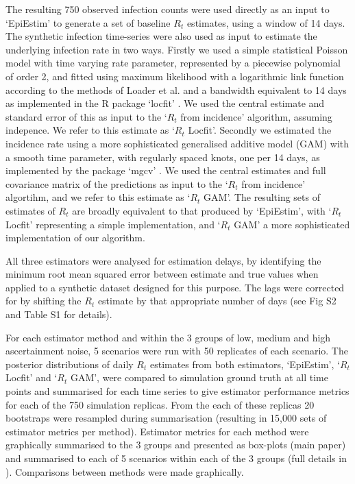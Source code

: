 \documentclass[10pt,letterpaper]{article}
\begin{document}
The resulting 750 observed infection counts were used directly as an input to `EpiEstim' to generate a set of baseline $R_t$ estimates, using a window of 14 days. The synthetic infection time-series were also used as input to estimate the underlying infection rate in two ways. Firstly we used a simple statistical Poisson model with time varying rate parameter, represented by a piecewise polynomial of order 2, and fitted using maximum likelihood with a logarithmic link function according to the methods of Loader et al. \cite{loader1999} and a bandwidth equivalent to 14 days as implemented in the R package `locfit' \cite{loader2020}. We used the central estimate and standard error of this as input to the `$R_t$ from incidence' algorithm, assuming indepence. We refer to this estimate as `$R_t$ Locfit'. Secondly we estimated the incidence rate using a more sophisticated generalised additive model (GAM) with a smooth time parameter, with regularly spaced knots, one per 14 days, as implemented by the package `mgcv' \cite{wood2017}. We used the central estimates and full covariance matrix of the predictions as input to the `$R_t$ from incidence' algortihm, and we refer to this estimate as `$R_t$ GAM'. The resulting sets of estimates of $R_t$ are broadly equivalent to that produced by `EpiEstim', with `$R_t$ Locfit' representing a simple implementation, and `$R_t$ GAM' a more sophisticated implementation of our algorithm.

All three estimators were analysed for estimation delays, by identifying the minimum root mean squared error between estimate and true values when applied to a synthetic dataset designed for this purpose. The lags were corrected for by shifting the $R_t$ estimate by that appropriate number of days (see  Fig S2 and Table S1 for details).

For each estimator method and within the 3 groups of low, medium and high ascertainment noise, 5 scenarios were run with 50 replicates of each scenario. The posterior distributions of daily $R_t$ estimates from both estimators, `EpiEstim', `$R_t$ Locfit' and `$R_t$ GAM', were compared to simulation ground truth at all time points and summarised for each time series to give estimator performance metrics for each of the 750 simulation replicas. From the each of these replicas 20 bootstraps were resampled during summarisation (resulting in 15,000 sets of estimator metrics per method). Estimator metrics for each method were graphically summarised to the 3 groups and presented as box-plots (main paper) and summarised to each of 5 scenarios within each of the 3 groups (full details in ). Comparisons between methods were made graphically.
\end{document}
